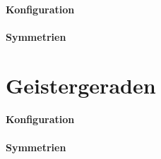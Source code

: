 \paragraph{Konfiguration}
\paragraph{Symmetrien}

\section{Geistergeraden}
\paragraph{Konfiguration}
\paragraph{Symmetrien}
